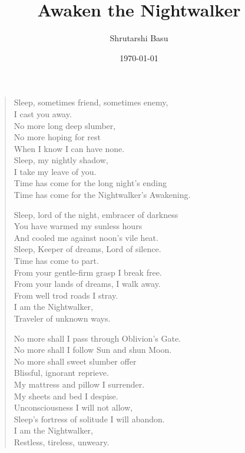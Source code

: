\documentclass[11pt,letterpaper]{article}
\title{Awaken the Nightwalker}
\author{Shrutarshi Basu}
\date{\today}
\begin{document}
\maketitle

\begin{center}
\end{center}

\begin{verse}
Sleep, sometimes friend, sometimes enemy, \\
I cast you away. \\
No more long deep slumber, \\
No more hoping for rest\\
When I know I can have none. \\
Sleep, my nightly shadow,\\
I take my leave of you.\\
Time has come for the long night's ending\\
Time has come for the Nightwalker's Awakening.

Sleep, lord of the night, embracer of darkness\\
You have warmed my sunless hours\\
And cooled me against noon's vile heat.\\
Sleep, Keeper of dreams, Lord of silence.\\
Time has come to part. \\
From your gentle-firm grasp I break free.\\
From your lands of dreams, I walk away.\\
From well trod roads I stray.\\
I am the Nightwalker, \\
Traveler of unknown ways.

No more shall I pass through Oblivion's Gate.\\
No more shall I follow Sun and shun Moon.\\
No more shall sweet slumber offer \\
Blissful, ignorant reprieve.\\
My mattress and pillow I surrender.\\
My sheets and bed I despise.\\
Unconsciousness I will not allow,\\
Sleep's fortress of solitude I will abandon.\\
I am the Nightwalker,\\
Restless, tireless, unweary. 


\end{verse}
\end{document}
